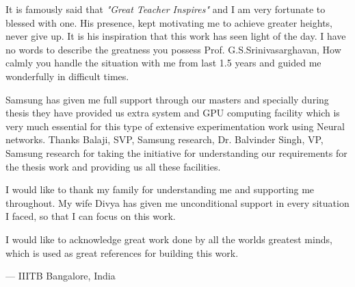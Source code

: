 It is famously said that \textit{"Great Teacher Inspires"} and I am very fortunate to blessed with one. His presence, kept motivating me to achieve greater heights, never give up. It is his inspiration that this work has seen light of the day. I have no words to describe the greatness you possess Prof. G.S.Srinivasarghavan, How calmly you handle the situation with me from last 1.5 years and guided me wonderfully in difficult times. 

Samsung has given me full support through our masters and specially during thesis they have provided us extra system and GPU computing facility which is very much essential for this type of extensive experimentation work using Neural networks. Thanks Balaji, SVP, Samsung research, Dr. Balvinder Singh, VP, Samsung research for taking the initiative for understanding our requirements for the thesis work and providing us all these facilities.

I would like to thank my family for understanding me and supporting me throughout. My wife Divya has given me unconditional support in every situation I faced, so that I can focus on this work.

I would like to acknowledge great work done by all the worlds greatest minds, which is used as great references for building this work.

\hfill --- IIITB Bangalore, India

